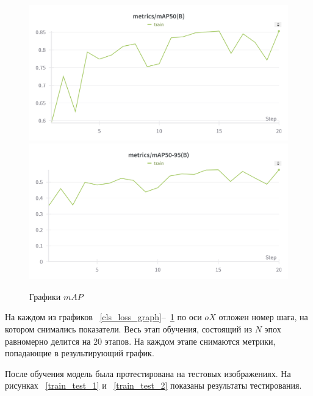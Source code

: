 \begin{figure}
    \includegraphics[scale=0.15]{img/train/map_50.png}
    \includegraphics[scale=0.15]{img/train/map50_95.png}
    \caption{Графики $mAP$}
    \label{map_graph}
\end{figure}

На каждом из графиков ~\ref{cls_loss_graph}--~\ref{map_graph} по оси $oX$ отложен номер шага, на котором снимались показатели. Весь этап обучения, состоящий из $N$ эпох равномерно делится на $20$ этапов. На каждом этапе снимаются метрики, попадающие в результирующий график.

После обучения модель была протестирована на тестовых изображениях. На рисунках ~\ref{train_test_1} и ~\ref{train_test_2} показаны результаты тестирования.

